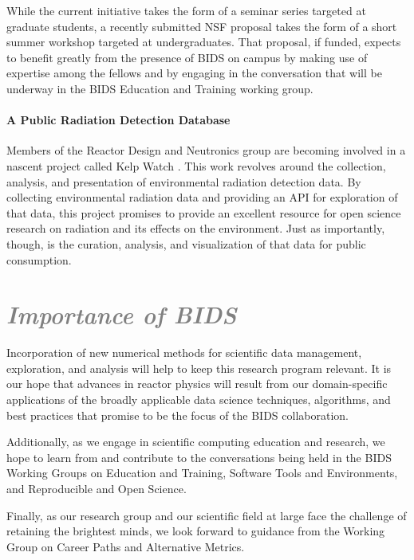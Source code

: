\documentclass[a4paper, 12pt]{article}
\begin{document}
While the current initiative takes the form of a seminar series targeted at 
graduate students, a recently submitted NSF proposal takes the form of a
short summer workshop targeted at undergraduates. That proposal, if funded, expects to 
benefit greatly from the presence of BIDS on campus by making use of expertise 
among the fellows and by engaging in the conversation that will be underway in 
the BIDS Education and Training working group.  


\paragraph{A Public Radiation Detection Database}

Members of the Reactor Design and Neutronics group are becoming involved in a 
nascent project called Kelp Watch \cite{vetter_about_2014}. This work revolves 
around the collection, analysis, and presentation of environmental radiation 
detection data. By collecting environmental radiation data and providing an API 
for exploration of that data, this project promises to provide an excellent 
resource for open science research on radiation and its effects on the 
environment. Just as importantly, though, is the curation, analysis, and 
visualization of that data for public consumption. 

\section*{\textcolor{gray}{\it Importance of BIDS}}

Incorporation of new numerical methods for scientific data management, 
exploration, and analysis will help to keep this research program relevant. 
It is our hope that advances in reactor physics will result from our 
domain-specific applications of the broadly applicable data science techniques, 
algorithms, and best practices that promise to be the focus of the BIDS 
collaboration.

Additionally, as we engage in scientific computing education and research, we 
hope to learn from and contribute to the conversations being held in the BIDS 
Working Groups on Education and Training, Software Tools and Environments, and 
Reproducible and Open Science.  

Finally, as our research group and our scientific field at large face the 
challenge of retaining the brightest minds, we look forward to guidance from the 
Working Group on Career Paths and Alternative Metrics.



\end{document}
